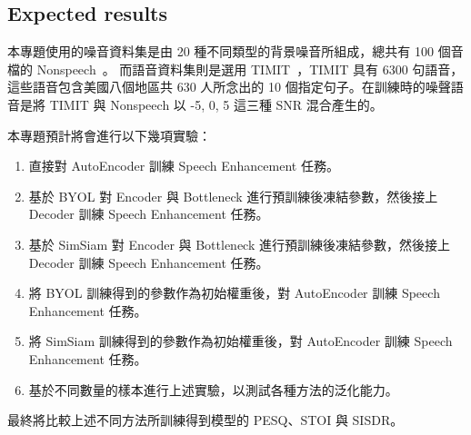 \documentclass[10pt,twocolumn,letterpaper]{article}
\begin{document}
\begin{CJK}{UTF8}{bkai}
   \section{Expected results}
   本專題使用的噪音資料集是由 20 種不同類型的背景噪音所組成，總共有 100 個音檔的 Nonspeech~\cite{Nonspeech}。
   而語音資料集則是選用 TIMIT~\cite{TIMIT}，TIMIT 具有 6300 句語音，這些語音包含美國八個地區共 630 人所念出的 10
   個指定句子。在訓練時的噪聲語音是將 TIMIT 與 Nonspeech 以 -5, 0, 5 這三種 SNR 混合產生的。



   本專題預計將會進行以下幾項實驗：
   \begin{enumerate}
      \item 直接對 AutoEncoder 訓練 Speech Enhancement 任務。
      \item 基於 BYOL 對 Encoder 與 Bottleneck 進行預訓練後凍結參數，然後接上 Decoder 訓練 Speech Enhancement 任務。
      \item 基於 SimSiam 對 Encoder 與 Bottleneck 進行預訓練後凍結參數，然後接上 Decoder 訓練 Speech Enhancement 任務。
      \item 將 BYOL 訓練得到的參數作為初始權重後，對 AutoEncoder 訓練 Speech Enhancement 任務。
      \item 將 SimSiam 訓練得到的參數作為初始權重後，對 AutoEncoder 訓練 Speech Enhancement 任務。
      \item 基於不同數量的樣本進行上述實驗，以測試各種方法的泛化能力。
   \end{enumerate}

   最終將比較上述不同方法所訓練得到模型的 PESQ\cite{PESQ}、STOI\cite{STOI} 與 SISDR\cite{SISDR}。


   {\small
   
   
   }
\end{CJK}
\end{document}
